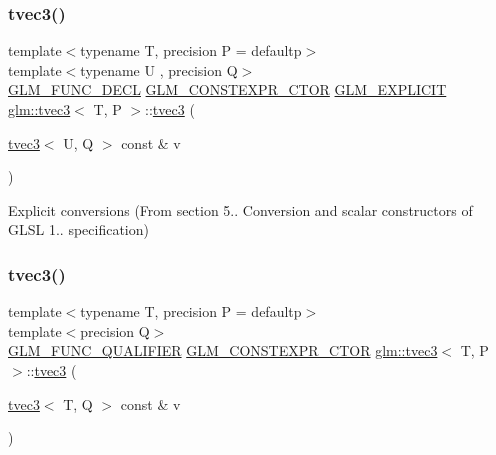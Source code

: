 \subsubsection{\texorpdfstring{tvec3()}{tvec3()}\hspace{0.1cm}{\footnotesize\ttfamily [14/23]}}
{\footnotesize\ttfamily template$<$typename T, precision P = defaultp$>$ \\
template$<$typename U , precision Q$>$ \\
\mbox{\hyperlink{setup_8hpp_ab2d052de21a70539923e9bcbf6e83a51}{G\+L\+M\+\_\+\+F\+U\+N\+C\+\_\+\+D\+E\+CL}} \mbox{\hyperlink{setup_8hpp_ad34178a09666081abdb573c14d1f4a5a}{G\+L\+M\+\_\+\+C\+O\+N\+S\+T\+E\+X\+P\+R\+\_\+\+C\+T\+OR}} \mbox{\hyperlink{setup_8hpp_a6c74f5a5e7b134ab69023ff9a30d4d5d}{G\+L\+M\+\_\+\+E\+X\+P\+L\+I\+C\+IT}} \mbox{\hyperlink{structglm_1_1tvec3}{glm\+::tvec3}}$<$ T, P $>$\+::\mbox{\hyperlink{structglm_1_1tvec3}{tvec3}} (\begin{DoxyParamCaption}\item[{\mbox{\hyperlink{structglm_1_1tvec3}{tvec3}}$<$ U, Q $>$ const \&}]{v }\end{DoxyParamCaption})}



Explicit conversions (From section 5.. Conversion and scalar constructors of G\+L\+SL 1.. specification) 

\mbox{\label{structglm_1_1tvec3_a60887256e89b9a7bb72e352171804e74}} 
\subsubsection{\texorpdfstring{tvec3()}{tvec3()}\hspace{0.1cm}{\footnotesize\ttfamily [15/23]}}
{\footnotesize\ttfamily template$<$typename T, precision P = defaultp$>$ \\
template$<$precision Q$>$ \\
\mbox{\hyperlink{setup_8hpp_a33fdea6f91c5f834105f7415e2a64407}{G\+L\+M\+\_\+\+F\+U\+N\+C\+\_\+\+Q\+U\+A\+L\+I\+F\+I\+ER}} \mbox{\hyperlink{setup_8hpp_ad34178a09666081abdb573c14d1f4a5a}{G\+L\+M\+\_\+\+C\+O\+N\+S\+T\+E\+X\+P\+R\+\_\+\+C\+T\+OR}} \mbox{\hyperlink{structglm_1_1tvec3}{glm\+::tvec3}}$<$ T, P $>$\+::\mbox{\hyperlink{structglm_1_1tvec3}{tvec3}} (\begin{DoxyParamCaption}\item[{\mbox{\hyperlink{structglm_1_1tvec3}{tvec3}}$<$ T, Q $>$ const \&}]{v }\end{DoxyParamCaption})}



